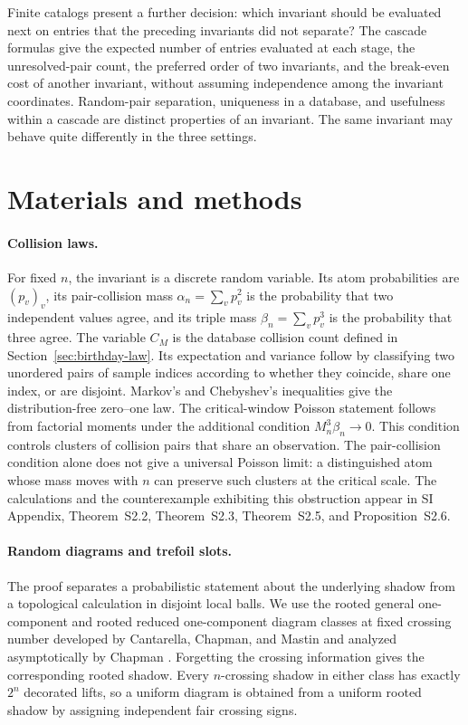\documentclass[9pt,twoside]{pnas-new}
\theoremstyle{definition}
\theoremstyle{remark}
\newcommand{\SILocation}[1]{SI Appendix, #1}
\newcommand{\SIExactCollisionCalculus}{Theorem~S2.2}
\newcommand{\SIUniversalBirthdayLaw}{Theorem~S2.3}
\newcommand{\SIPoissonWindow}{Theorem~S2.5}
\newcommand{\SIHeavyAtomCounterexample}{Proposition~S2.6}
\begin{document}
Finite catalogs present a further decision: which invariant should be evaluated next on entries that the preceding invariants did not separate?  The cascade formulas give the expected number of entries evaluated at each stage, the unresolved-pair count, the preferred order of two invariants, and the break-even cost of another invariant, without assuming independence among the invariant coordinates.  Random-pair separation, uniqueness in a database, and usefulness within a cascade are distinct properties of an invariant.  The same invariant may behave quite differently in the three settings.
\section{Materials and methods}
\label{sec:methods}
\paragraph{Collision laws.}
For fixed $n$, the invariant is a discrete random variable.  Its atom probabilities are $(p_v)_v$, its pair-collision mass $\alpha_n=\sum_vp_v^2$ is the probability that two independent values agree, and its triple mass $\beta_n=\sum_vp_v^3$ is the probability that three agree.  The variable $C_M$ is the database collision count defined in Section~\ref{sec:birthday-law}.  Its expectation and variance follow by classifying two unordered pairs of sample indices according to whether they coincide, share one index, or are disjoint.  Markov's and Chebyshev's inequalities give the distribution-free zero--one law.  The critical-window Poisson statement follows from factorial moments under the additional condition $M_n^3\beta_n\to0$.  This condition controls clusters of collision pairs that share an observation.  The pair-collision condition alone does not give a universal Poisson limit: a distinguished atom whose mass moves with $n$ can preserve such clusters at the critical scale.  The calculations and the counterexample exhibiting this obstruction appear in \SILocation{\SIExactCollisionCalculus{}, \SIUniversalBirthdayLaw{}, \SIPoissonWindow{}, and \SIHeavyAtomCounterexample{}}.

\paragraph{Random diagrams and trefoil slots.}
The proof separates a probabilistic statement about the underlying shadow from a topological calculation in disjoint local balls.  We use the rooted general one-component and rooted reduced one-component diagram classes at fixed crossing number developed by Cantarella, Chapman, and Mastin and analyzed asymptotically by Chapman \cite{cantarellachapmanmastin2016,chapman2017}.  Forgetting the crossing information gives the corresponding rooted shadow.  Every $n$-crossing shadow in either class has exactly $2^n$ decorated lifts, so a uniform diagram is obtained from a uniform rooted shadow by assigning independent fair crossing signs.
\end{document}
